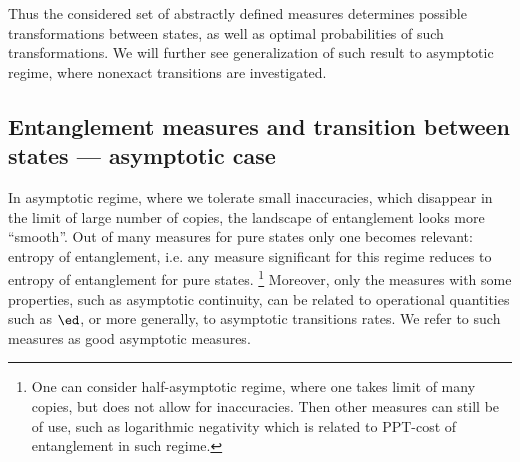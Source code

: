 \documentclass[rmp,12pt,preprint]{revtex4-2}
\begin{document}
Thus the considered set of abstractly defined measures determines
possible transformations between states, as well as optimal probabilities
of such transformations. We will further see generalization of such
result to asymptotic regime, where nonexact transitions are  investigated.




\subsection{Entanglement measures and transition between states --- asymptotic case}
\label{subsec:asym} In asymptotic  regime, where we tolerate small
inaccuracies, which disappear in the limit of large number of
copies, the landscape of entanglement looks more ``smooth''.
Out of many measures for pure states only one becomes
relevant: entropy of entanglement, i.e. any measure significant for
this regime reduces to entropy of entanglement for pure states.
\footnote{One can consider half-asymptotic regime, where one takes limit
of many copies, but does not allow for inaccuracies. Then other measures
can still be of use, such as logarithmic negativity which is related
to PPT-cost of entanglement \cite{AudenaertPE2002-PPT} in such regime.}
Moreover, only the measures with some properties, such as asymptotic
continuity, can be related to operational quantities such as $\ed$,
or more generally, to asymptotic transitions rates. We refer to such
measures as good asymptotic measures.
\end{document}
